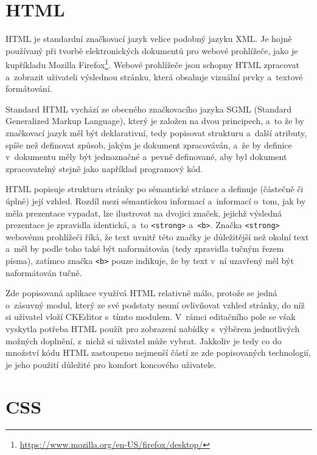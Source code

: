 \documentclass[a4paper,11pt,openany]{book} %
\begin{document}
\begin{spacing}{1.05}
\section{HTML}

HTML je standardní značkovací jazyk velice podobný jazyku XML. Je hojně používaný při tvorbě elektronických dokumentů pro webové prohlížeče, jako je kupříkladu Mozilla Firefox\footnote{\url{https://www.mozilla.org/en-US/firefox/desktop/}}. Webové prohlížeče jsou schopny HTML zpracovat a~zobrazit uživateli výslednou stránku, která obsahuje vizuální prvky a~textové formátování. \parencite[19--22]{raggett1999html}

Standard HTML vychází ze obecného značkovacího jazyka SGML (Standard Generalized Markup Language), který je založen na dvou principech, a~to že by značkovací jazyk měl být deklarativní, tedy popisovat strukturu a~další atributy, spíše než definovat způsob, jakým je dokument zpracováván, a~že by definice v~dokumentu měly být jednoznačné a~pevně definované, aby byl dokument zpracovatelný stejně jako například programový kód. \parencite{rubinsky1990sgml} %


HTML popisuje strukturu stránky po sémantické stránce a definuje (částečně či úplně) její vzhled. Rozdíl mezi sémantickou informací a~informací o~tom, jak by měla prezentace vypadat, lze ilustrovat na dvojici značek, jejichž výsledná prezentace je zpravidla identická, a~to {\tt <strong>} a~{\tt <b>}. Značka {\tt <strong>} webovému prohlížeči říká, že text uvnitř této značky je důležitější než okolní text a~měl by podle toho také být naformátován (tedy zpravidla tučným řezem písma), zatímco značka {\tt <b>} pouze indikuje, že by text v~ní uzavřený měl být naformátován tučně. %


Zde popisovaná aplikace využívá HTML relativně málo, protože se jedná o~zásuvný modul, který ze své podstaty nesmí ovlivňovat vzhled stránky, do níž si uživatel vloží CKEditor s~tímto modulem. V~rámci editačního pole se však vyskytla potřeba HTML použít pro zobrazení nabídky s~výběrem jednotlivých možných doplnění, z~nichž si uživatel může vybrat. Jakkoliv je tedy co do množství kódu HTML zastoupeno nejmenší částí ze zde popisovaných technologií, je jeho použití důležité pro komfort koncového uživatele.

\section{CSS}


\end{spacing}
\end{document}
